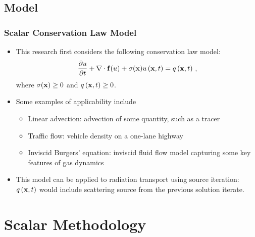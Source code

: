 \documentclass{beamer} \useoutertheme{infolines}
\begin{document}
\subsection{Model}
\begin{frame}
\frametitle{Scalar Conservation Law Model}

\begin{itemize}
  \item This research first considers the following conservation law model:
    \begin{equation}
      \frac{\partial u}{\partial t} + \nabla\cdot\mathbf{f}(u)
      + \sigma(\mathbf{x})u\left(\mathbf{x},t\right) = q\left(\mathbf{x},t\right) \,,
    \end{equation}
    where $\sigma(\mathbf{x})\ge 0$ and $q\left(\mathbf{x},t\right)\ge 0$.
  \item Some examples of applicability include
    \begin{itemize}
      \item \textcolor{secondarycolorheavy}{Linear advection}:
        advection of some quantity, such as a tracer
      \item \textcolor{secondarycolorheavy}{Traffic flow}:
        vehicle density on a one-lane highway
      \item \textcolor{secondarycolorheavy}{Inviscid Burgers' equation}:
        inviscid fluid flow model capturing some key features of gas dynamics
    \end{itemize}
  \item This model can be applied to radiation transport using source iteration:
    $q\left(\mathbf{x},t\right)$ would include scattering source from the previous solution iterate.
\end{itemize}

\end{frame}
\section{Scalar Methodology}
\end{document}
